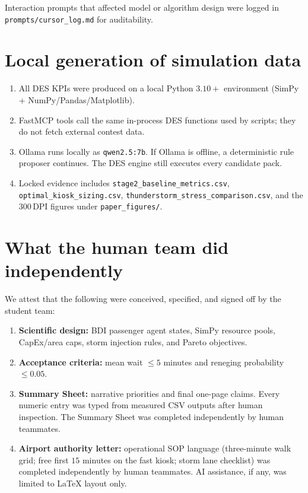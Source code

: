 \documentclass[11pt]{article}
\begin{document}
Interaction prompts that affected model or algorithm design were logged
in \texttt{prompts/cursor\_log.md} for auditability.

\section{Local generation of simulation data}
\begin{enumerate}[leftmargin=1.4em]
  \item All DES KPIs were produced on a local Python $3.10+$ environment
        (SimPy + NumPy/Pandas/Matplotlib).
  \item FastMCP tools call the same in-process DES functions used by
        scripts; they do not fetch external contest data.
  \item Ollama runs locally as \texttt{qwen2.5:7b}.
        If Ollama is offline, a deterministic rule proposer continues.
        The DES engine still executes every candidate pack.
  \item Locked evidence includes
        \texttt{stage2\_baseline\_metrics.csv},
        \texttt{optimal\_kiosk\_sizing.csv},
        \texttt{thunderstorm\_stress\_comparison.csv},
        and the $300$\,DPI figures under \texttt{paper\_figures/}.
\end{enumerate}

\section{What the human team did independently}
We attest that the following were conceived, specified, and signed off
by the student team:
\begin{enumerate}[leftmargin=1.4em]
  \item \textbf{Scientific design:} BDI passenger agent states, SimPy
        resource pools, CapEx/area caps, storm injection rules, and
        Pareto objectives.
  \item \textbf{Acceptance criteria:} mean wait $\le 5$ minutes and
        reneging probability $\le 0.05$.
  \item \textbf{Summary Sheet:} narrative priorities and final one-page
        claims.
        Every numeric entry was typed from measured CSV outputs after
        human inspection.
        The Summary Sheet was completed independently by human teammates.
  \item \textbf{Airport authority letter:} operational SOP language
        (three-minute walk grid; free first $15$ minutes on the fast
        kiosk; storm lane checklist) was completed independently by
        human teammates.
        AI assistance, if any, was limited to LaTeX layout only.
\end{enumerate}
\end{document}
